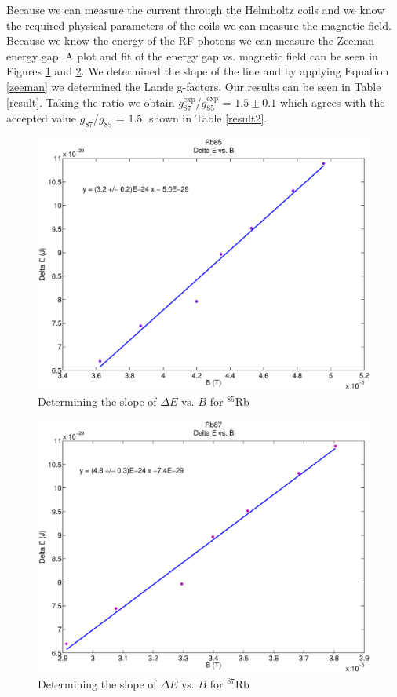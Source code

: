 Because we can measure the current through the Helmholtz coils and we know the required physical parameters of the coils we can measure the magnetic field. Because we know the energy of the RF photons we can measure the Zeeman energy gap. A plot and fit of the energy gap vs. magnetic field can be seen in Figures \ref{rb85line} and \ref{rb87line}. We determined the slope of the line and by applying Equation \ref{zeeman} we determined the Lande g-factors. Our results can be seen in Table \ref{result}. Taking the ratio we obtain $g^{\mathrm{exp}}_{87}$/$g^{\mathrm{exp}}_{85}$ = $1.5 \pm 0.1$ which agrees with the accepted value $g_{87}$/$g_{85}$ = 1.5, shown in Table \ref{result2}.
\begin{figure}[H]
  \includegraphics[totalheight=0.6\textwidth]{figs/rb85}
  \caption{Determining the slope of  $\Delta E$ vs. $B$  for  $^{85}$Rb}
  \label{rb85line}
\end{figure}

\begin{figure}[H]
  \includegraphics[totalheight=0.6\textwidth]{figs/rb87}
  \caption{Determining the slope of $\Delta E$ vs. $B$  for  $^{87}$Rb}
  \label{rb87line}
\end{figure}

